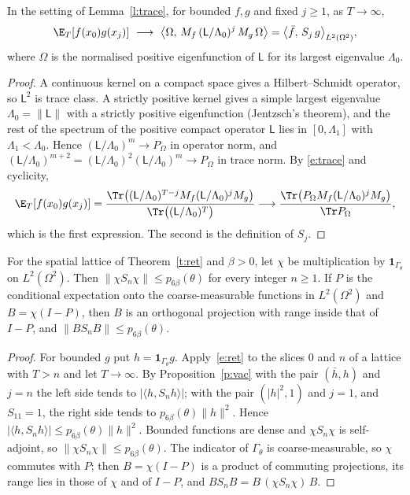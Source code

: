 \begin{proposition}\label{p:vac}
In the setting of Lemma~\ref{l:trace}, for bounded $f,g$ and fixed $j\ge1$, as $T\to\infty$,
\[
\E_T[f(x_0)g(x_j)]\ \longrightarrow\ \big\langle\Omega,\,M_f\,(\mathsf L/\Lambda_0)^j\,M_g\,\Omega\big\rangle
=\big\langle\bar f,\,S_j\,g\big\rangle_{L^2(\Omega^2)} ,
\]
where $\Omega$ is the normalised positive eigenfunction of $\mathsf L$ for its largest eigenvalue $\Lambda_0$.
\end{proposition}
\begin{proof}
A continuous kernel on a compact space gives a Hilbert--Schmidt operator, so $\mathsf L^2$ is trace class.
A strictly positive kernel gives a simple largest eigenvalue $\Lambda_0=\|\mathsf L\|$ with a strictly positive
eigenfunction (Jentzsch's theorem), and the rest of the spectrum of the positive compact operator $\mathsf L$
lies in $[0,\Lambda_1]$ with $\Lambda_1<\Lambda_0$. Hence $(\mathsf L/\Lambda_0)^m\to P_\Omega$ in operator norm,
and $(\mathsf L/\Lambda_0)^{m+2}=(\mathsf L/\Lambda_0)^2(\mathsf L/\Lambda_0)^m\to P_\Omega$ in trace norm. By
\eqref{e:trace} and cyclicity,
\[
\E_T[f(x_0)g(x_j)]=\frac{\Tr\big((\mathsf L/\Lambda_0)^{T-j}M_f(\mathsf L/\Lambda_0)^jM_g\big)}{\Tr\big((\mathsf L/\Lambda_0)^T\big)}
\longrightarrow\frac{\Tr\big(P_\Omega M_f(\mathsf L/\Lambda_0)^jM_g\big)}{\Tr P_\Omega},
\]
which is the first expression. The second is the definition of $S_j$.
\end{proof}

\begin{corollary}\label{c:vac}
For the spatial lattice of Theorem~\ref{t:ret} and $\beta>0$, let $\chi$ be
multiplication by $\mathbf 1_{\Gamma_\theta}$ on $L^2(\Omega^2)$. Then $\|\chi S_n\chi\|\le p_{6\beta}(\theta)$ for every
integer $n\ge1$. If $P$ is the conditional expectation onto the coarse-measurable functions in
$L^2(\Omega^2)$ and $B=\chi(I-P)$, then $B$ is an orthogonal projection with range inside that of $I-P$, and
$\|BS_nB\|\le p_{6\beta}(\theta)$.
\end{corollary}
\begin{proof}
For bounded $g$ put $h=\mathbf 1_{\Gamma_\theta}g$. Apply~\eqref{e:ret} to the slices $0$ and $n$ of a lattice
with $T>n$ and let $T\to\infty$. By Proposition~\ref{p:vac} with the pair $(\bar h,h)$ and $j=n$ the left side
tends to $|\langle h,S_nh\rangle|$; with the pair $(|h|^2,1)$ and $j=1$, and $S_11=1$, the right side tends to
$p_{6\beta}(\theta)\|h\|^2$. Hence $|\langle h,S_nh\rangle|\le p_{6\beta}(\theta)\|h\|^2$. Bounded functions
are dense and $\chi S_n\chi$ is self-adjoint, so $\|\chi S_n\chi\|\le p_{6\beta}(\theta)$. The indicator of $\Gamma_\theta$ is
coarse-measurable, so $\chi$ commutes with $P$; then $B=\chi(I-P)$ is a product of commuting projections, its range
lies in those of $\chi$ and of $I-P$, and $BS_nB=B\,(\chi S_n\chi)\,B$.
\end{proof}

